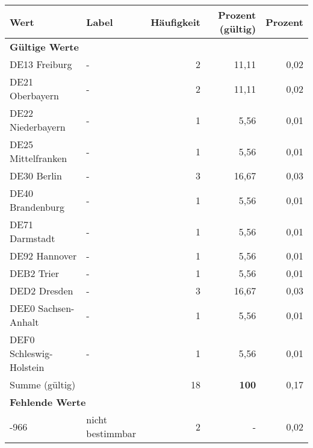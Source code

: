      \begin{longtable}{Xlrrr}
     \toprule
     \textbf{Wert} & \textbf{Label} & \textbf{Häufigkeit} & \textbf{Prozent (gültig)} & \textbf{Prozent} \\
     \endhead
     \midrule
     \multicolumn{5}{l}{\textbf{Gültige Werte}}\\

     \multicolumn{1}{X}{DE13 Freiburg} &
     - &
     2 &
     11,11 &
     0,02 \\

     \multicolumn{1}{X}{DE21 Oberbayern} &
     - &
     2 &
     11,11 &
     0,02 \\

     \multicolumn{1}{X}{DE22 Niederbayern} &
     - &
     1 &
     5,56 &
     0,01 \\

     \multicolumn{1}{X}{DE25 Mittelfranken} &
     - &
     1 &
     5,56 &
     0,01 \\

     \multicolumn{1}{X}{DE30 Berlin} &
     - &
     3 &
     16,67 &
     0,03 \\

     \multicolumn{1}{X}{DE40 Brandenburg} &
     - &
     1 &
     5,56 &
     0,01 \\

     \multicolumn{1}{X}{DE71 Darmstadt} &
     - &
     1 &
     5,56 &
     0,01 \\

     \multicolumn{1}{X}{DE92 Hannover} &
     - &
     1 &
     5,56 &
     0,01 \\

     \multicolumn{1}{X}{DEB2 Trier} &
     - &
     1 &
     5,56 &
     0,01 \\

     \multicolumn{1}{X}{DED2 Dresden} &
     - &
     3 &
     16,67 &
     0,03 \\

     \multicolumn{1}{X}{DEE0 Sachsen-Anhalt} &
     - &
     1 &
     5,56 &
     0,01 \\

     \multicolumn{1}{X}{DEF0 Schleswig-Holstein} &
     - &
     1 &
     5,56 &
     0,01 \\
     \midrule
      \multicolumn{2}{l}{Summe (gültig)} & 18 &
      \textbf{100} &
         0,17 \\
     \multicolumn{5}{l}{\textbf{Fehlende Werte}}\\
       -966 & nicht bestimmbar & 2 & - & 0,02 \\


\end{longtable}

